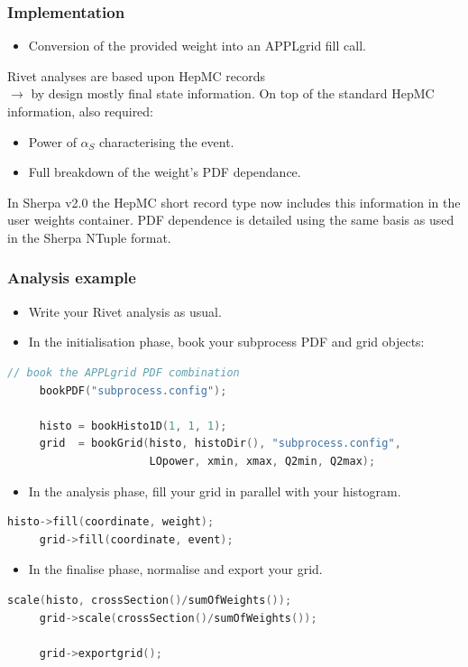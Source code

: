 \documentclass[10pt]{beamer}
\begin{document}
\begin{frame}
\frametitle{Implementation}
\begin{itemize}
\item<1-> Conversion of the provided weight into an APPLgrid fill call.
\end{itemize}
\vskip5pt
Rivet analyses are based upon HepMC records\\
\quad\quad$\to$ by design mostly final state information.
\vskip15pt
On top of the standard HepMC information, also required:
\begin{itemize}
\item<1-> Power of $\alpha_S$ characterising the event.
\item<1-> Full breakdown of the weight's PDF dependance.
\end{itemize}
\vskip15pt
In Sherpa v2.0 the HepMC short record type now includes this information in the user weights container.
\vskip15pt
PDF dependence is detailed using the same basis as used in the Sherpa NTuple format.

\end{frame}

\begin{frame}[fragile]
\frametitle{Analysis example}
\begin{itemize}
\item<1-> Write your Rivet analysis as usual.
\item<1-> In the initialisation phase, book your subprocess PDF and grid objects:
\end{itemize}
\vskip-10pt
\begin{lstlisting}[language=c++]
     // book the APPLgrid PDF combination
     bookPDF("subprocess.config");

     histo = bookHisto1D(1, 1, 1);
     grid  = bookGrid(histo, histoDir(), "subprocess.config", 
                      LOpower, xmin, xmax, Q2min, Q2max);

\end{lstlisting}
\begin{itemize}
\item<1-> In the analysis phase, fill your grid in parallel with your histogram.
\end{itemize}
\vskip-10pt

\begin{lstlisting}[language=c++]
     histo->fill(coordinate, weight);        
     grid->fill(coordinate, event);
\end{lstlisting}

\begin{itemize}
\item<1-> In the finalise phase, normalise and export your grid.
\end{itemize}
\vskip-10pt
\begin{lstlisting}[language=c++]
     scale(histo, crossSection()/sumOfWeights());
     grid->scale(crossSection()/sumOfWeights());
      
     grid->exportgrid();
\end{lstlisting}

\end{frame}
\end{document}
